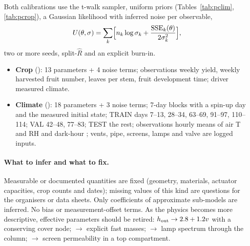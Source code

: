 Both calibrations use the t-walk sampler, uniform priors (Tables~\ref{tab:pclim}, \ref{tab:pcrop}), a Gaussian likelihood
with inferred noise per observable,
\begin{equation}
U(\theta,\sigma)=\sum_k\Bigl[n_k\log\sigma_k+\frac{\mathrm{SSE}_k(\theta)}{2\sigma_k^2}\Bigr],
\end{equation}
two or more seeds, split-$\hat R$ and an explicit burn-in.
\begin{itemize}[nosep]
\item \textbf{Crop} (): 13 parameters + 4 noise terms; observations weekly yield, weekly
harvested fruit number, leaves per stem, fruit development time; driver measured climate.
\item \textbf{Climate} (): 18 parameters + 3 noise terms; 7-day blocks with a spin-up day and the
measured initial state; TRAIN days 7--13, 28--34, 63--69, 91--97, 110--114; VAL 42--48, 77--83; TEST the rest; observations
hourly means of air T and RH and dark-hour ; vents, pipe, screens, lamps and  valve are logged inputs.
\end{itemize}
\paragraph{What to infer and what to fix.} Measurable or documented quantities are fixed (geometry, materials, actuator
capacities, crop counts and dates); missing values of this kind are questions for the organisers or data sheets. Only
coefficients of approximate sub-models are inferred. No bias or measurement-offset terms. As the physics becomes more
descriptive, effective parameters should be retired: $h_{\rm out}\to2.8+1.2v$ with a conserving cover node;
 $\to$ explicit fast masses;  $\to$ lamp spectrum through the column;
 $\to$ screen permeability in a top compartment.
